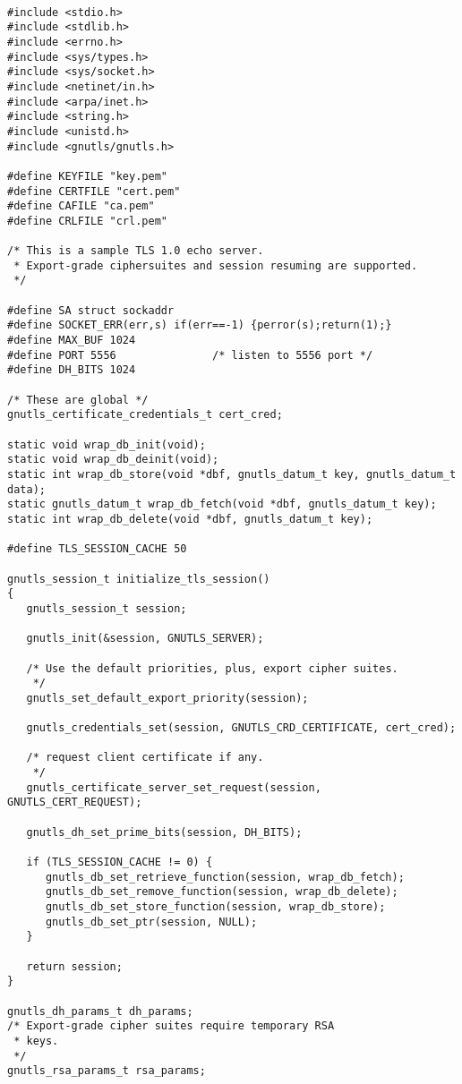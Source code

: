 \begin{verbatim}

#include <stdio.h>
#include <stdlib.h>
#include <errno.h>
#include <sys/types.h>
#include <sys/socket.h>
#include <netinet/in.h>
#include <arpa/inet.h>
#include <string.h>
#include <unistd.h>
#include <gnutls/gnutls.h>

#define KEYFILE "key.pem"
#define CERTFILE "cert.pem"
#define CAFILE "ca.pem"
#define CRLFILE "crl.pem"

/* This is a sample TLS 1.0 echo server.
 * Export-grade ciphersuites and session resuming are supported.
 */

#define SA struct sockaddr
#define SOCKET_ERR(err,s) if(err==-1) {perror(s);return(1);}
#define MAX_BUF 1024
#define PORT 5556               /* listen to 5556 port */
#define DH_BITS 1024

/* These are global */
gnutls_certificate_credentials_t cert_cred;

static void wrap_db_init(void);
static void wrap_db_deinit(void);
static int wrap_db_store(void *dbf, gnutls_datum_t key, gnutls_datum_t data);
static gnutls_datum_t wrap_db_fetch(void *dbf, gnutls_datum_t key);
static int wrap_db_delete(void *dbf, gnutls_datum_t key);

#define TLS_SESSION_CACHE 50

gnutls_session_t initialize_tls_session()
{
   gnutls_session_t session;

   gnutls_init(&session, GNUTLS_SERVER);

   /* Use the default priorities, plus, export cipher suites.
    */
   gnutls_set_default_export_priority(session);

   gnutls_credentials_set(session, GNUTLS_CRD_CERTIFICATE, cert_cred);

   /* request client certificate if any.
    */
   gnutls_certificate_server_set_request(session, GNUTLS_CERT_REQUEST);

   gnutls_dh_set_prime_bits(session, DH_BITS);

   if (TLS_SESSION_CACHE != 0) {
      gnutls_db_set_retrieve_function(session, wrap_db_fetch);
      gnutls_db_set_remove_function(session, wrap_db_delete);
      gnutls_db_set_store_function(session, wrap_db_store);
      gnutls_db_set_ptr(session, NULL);
   }

   return session;
}

gnutls_dh_params_t dh_params;
/* Export-grade cipher suites require temporary RSA
 * keys.
 */
gnutls_rsa_params_t rsa_params;


\end{verbatim}
